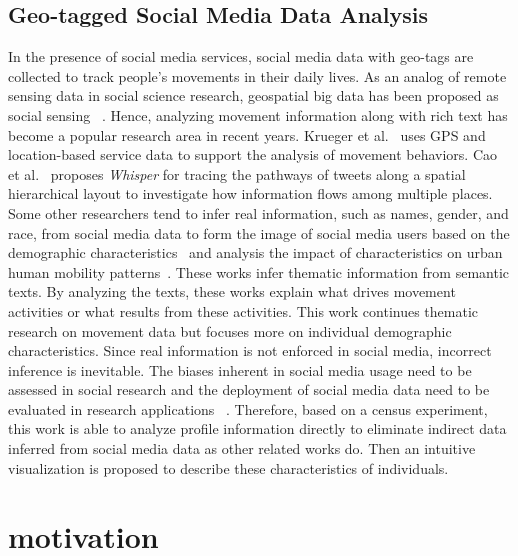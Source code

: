 \documentclass{ieeeaccess}
\begin{document}
\subsection{Geo-tagged Social Media Data Analysis}
In the presence of social media services, social media data with geo-tags are collected to track people's movements in their daily lives. As an analog of remote sensing data in social science research, geospatial big data has been proposed as social sensing ~\cite{liu2015social}. Hence, analyzing movement information along with rich text has become a popular research area in recent years. Krueger et al.~\cite{krueger2014visual} uses GPS and location-based service data to support the analysis of movement behaviors. Cao et al.~\cite{cao2012whisper} proposes \textit{Whisper} for tracing the pathways of tweets along a spatial hierarchical layout to investigate how information flows among multiple places. Some other researchers tend to infer real information, such as names, gender, and race, from social media data to form the image of social media users based on the demographic characteristics~\cite{peddinti2014internet} and analysis the impact of characteristics on urban human mobility patterns~\cite{luo2016explore}. These works infer thematic information from semantic texts. By analyzing the texts, these works explain what drives movement activities or what results from these activities. This work continues thematic research on movement data but focuses more on individual demographic characteristics. Since real information is not enforced in social media, incorrect inference is inevitable. The biases inherent in social media usage need to be assessed in social research and the deployment of social media data need to be evaluated in research applications~\cite{Longley2015, Paul2016_twitter} . Therefore, based on a census experiment, this work is able to analyze profile information directly to eliminate indirect data inferred from social media data as other related works do. Then an intuitive visualization is proposed to describe these characteristics of individuals.
\section{motivation}
\end{document}

